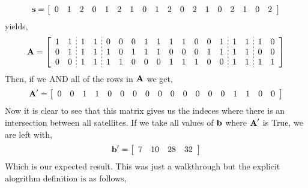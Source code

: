 \begin{equation*} 
    \bm{\mathrm{s}} = 
    \left[
    \begin{array}{cccccccccccccccccc}
	0 & 1 & 2 & 0 & 1 & 2 & 1 & 0 & 1 & 2 & 0 & 2 & 1 & 0 & 2 & 1 & 0 & 2 \\
    \end{array}
    \right]
\end{equation*}
yields,
\begin{equation*} 
    \se{A} = 
    \left[
	\begin{array}{cc;{2pt/2pt}cc;{2pt/2pt}cccccccccc;{2pt/2pt}cc;{2pt/2pt}cc}
	1 & 1 & 1 & 1 & 0 & 0 & 0 & 1 & 1 & 1 & 1 & 0 & 0 & 1 & 1 & 1 & 1 & 0 \\
	0 & 1 & 1 & 1 & 1 & 0 & 1 & 1 & 1 & 0 & 0 & 0 & 1 & 1 & 1 & 1 & 0 & 0 \\
	0 & 0 & 1 & 1 & 1 & 1 & 0 & 0 & 0 & 1 & 1 & 1 & 0 & 0 & 1 & 1 & 1 & 1 \\
    \end{array}
    \right]
\end{equation*}
Then, if we AND all of the rows in $\bm{\mathrm{A}}$ we get,
\begin{equation*} 
    \bm{\mathrm{A}}' = 
    \left[
    \begin{array}{cccccccccccccccccc}
	0 & 0 & 1 & 1 & 0 & 0 & 0 & 0 & 0 & 0 & 0 & 0 & 0 & 0 & 1 & 1 & 0 & 0 \\
    \end{array}
    \right]
\end{equation*}
Now it is clear to see that this matrix gives us the indeces where there is an
intersection between all satellites. If we take all values of $\bm{\mathrm{b}}$ where
$\bm{\mathrm{A}}'$ is True, we are left with,
\begin{equation*} 
    \bm{\mathrm{b}}' = 
    \left[
    \begin{array}{cccccccccccccccccc}
	7 & 10 & 28 & 32
    \end{array}
    \right]
\end{equation*}
Which is our expected result. This was just a walkthrough but the explicit
alogrithm definition is as follows,

